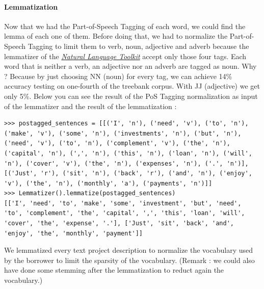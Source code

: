 		\paragraph{Lemmatization}
			Now that we had the Part-of-Speech Tagging of each word, we could find the lemma of each one of them. Before doing that, we had to normalize the Part-of-Speech Tagging to limit them to verb, noun, adjective and adverb because the lemmatizer of the \href{http://www.nltk.org/}{\textit{Natural Language Toolkit}} accept only those four tags. Each word that is neither a verb, an adjective nor an adverb are tagged as noun. Why ? Because by just choosing NN  (noun) for every tag, we can achieve 14\% accuracy testing on one-fourth of the treebank corpus. With JJ (adjective) we get only 5\%. Below you can see the result of the PoS Tagging normalization as input of the lemmatizer and the result of the lemmatization :
			\begin{verbatim}
>>> postagged_sentences = [[('I', 'n'), ('need', 'v'), ('to', 'n'), ('make', 'v'), ('some', 'n'), ('investments', 'n'), ('but', 'n'), ('need', 'v'), ('to', 'n'), ('complement', 'v'), ('the', 'n'), ('capital', 'n'), (',', 'n'), ('this', 'n'), ('loan', 'n'), ('will', 'n'), ('cover', 'v'), ('the', 'n'), ('expenses', 'n'), ('.', 'n')],[('Just', 'r'), ('sit', 'n'), ('back', 'r'), ('and', 'n'), ('enjoy', 'v'), ('the', 'n'), ('monthly', 'a'), ('payments', 'n')]]
>>> Lemmatizer().lemmatize(postagged_sentences)
[['I', 'need', 'to', 'make', 'some', 'investment', 'but', 'need', 'to', 'complement', 'the', 'capital', ',', 'this', 'loan', 'will', 'cover', 'the', 'expense', '.'], ['Just', 'sit', 'back', 'and', 'enjoy', 'the', 'monthly', 'payment']]
			\end{verbatim}
			We lemmatized every text project description to normalize the vocabulary used by the borrower to limit the sparsity of the vocabulary. (Remark : we could also have done some stemming after the lemmatization to reduct again the vocabulary.)

